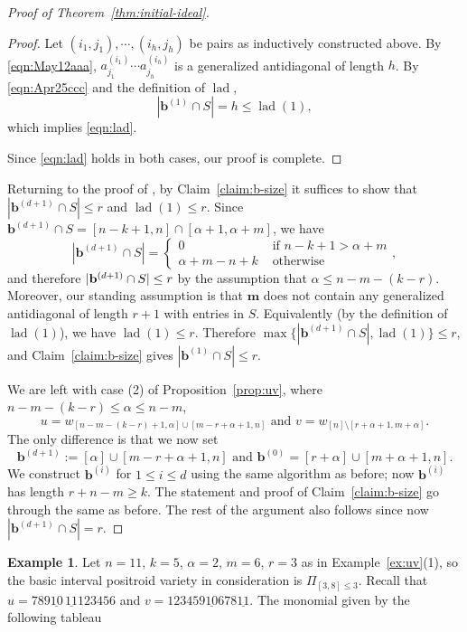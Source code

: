 \documentclass[12pt,reqno]{amsart}
\theoremstyle{definition}
\newtheorem{example}[lemma]{Example}
\newcommand{\lad}{\operatorname{lad}}
\newcommand{\bb}{\mathbf b}
\newcommand{\mm}{\mathbf m}
\DeclarePairedDelimiter\abs{\lvert}{\rvert}%
\begin{document}
{\begin{proof}[Proof of Theorem~\ref{thm:initial-ideal}]
\begin{proof}
        
        Let $(i_1,j_1),\cdots, (i_h,j_h)$ be pairs as inductively constructed above. By \eqref{eqn:May12aaa}, $a_{j_1}^{(i_1)}\cdots a_{j_h}^{(i_h)}$ is a generalized antidiagonal of length $h$. By \eqref{eqn:Apr25ccc} and the definition of $\lad$,
        \begin{equation}\label{eqn:Apr25bbb}
            |\bb^{(1)}\cap S |=h\le \lad(1),
        \end{equation}
        which implies \eqref{eqn:lad}.
        
        
        Since \eqref{eqn:lad} holds in both cases, our proof is complete.
    \end{proof}


    Returning to the proof of , by Claim~\ref{claim:b-size} it suffices to show that 
\(|\bb^{(d+1)}\cap S|\le r\) and \(\lad(1)\le r\).
    Since $\mathbf{b}^{(d+1)}\cap S=[n-k+1,n]\cap[\alpha+1,\alpha+m]$, we have
         \[|\bb^{(d+1)}\cap S|=\begin{cases}0 &\text{ if } n-k+1>\alpha+m \\
         \alpha+m-n+k & \text{ otherwise}\end{cases},\]
    and therefore $\abs{\bb^{(d+1)}\cap S} \le r$ by the assumption that $\alpha \le n-m-(k-r)$.
Moreover, our standing assumption is that 
\(\mm\) does not contain any generalized antidiagonal of length \(r+1\) with entries in \(S\).
Equivalently (by the definition of \(\lad(1)\)), we have \(\lad(1)\le r\).
Therefore \(\max\{|\bb^{(d+1)}\cap S|,\lad(1)\}\le r\), and Claim~\ref{claim:b-size} gives
\(|\bb^{(1)}\cap S|\le r\).
    
    
    We are left with case (2) of Proposition~\ref{prop:uv}, where $n-m-(k-r)\leq \alpha \leq n-m$, \[u = w_{[n-m-(k-r)+1,\alpha]\cup[m-r+\alpha+1,n]}\text{ and }v = w_{[n]\setminus [r+\alpha+1,m+\alpha]}.\] The only difference is that we now set \[\bb^{(d+1)}:=[\alpha]\cup [m-r+\alpha+1,n]\text{ and }\bb^{(0)}=[r+\alpha]\cup [m+\alpha+1, n].\]
    We construct $\bb^{(i)}$ for $1\le i\le d$ using the same algorithm as before; now $\bb^{(i)}$ has length $r+n-m\ge k$. The statement and proof of Claim~\ref{claim:b-size} go through the same as before. The rest of the argument also follows since now $|\bb^{(d+1)}\cap S|=r$.
\end{proof}
    
\begin{example}
    Let $n=11$, $k=5$, $\alpha=2$, $m=6$, $r=3$ as in Example~\ref{ex:uv}(1), so the basic interval positroid variety in consideration is $\Pi_{[3,8]\le 3}$. Recall that $u=789\underline{10}\,\underline{11}123456$ and $v=123459\underline{10}678\underline{11}$. The  monomial given by the following tableau


\end{example}}
\end{document}
